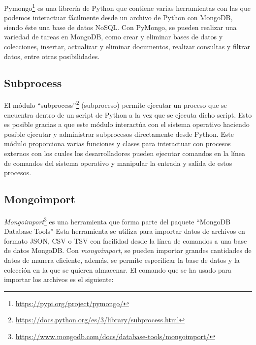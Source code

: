 \documentclass[a4paper, 12pt]{book}
\begin{document}
Pymongo\footnote{\url{https://pypi.org/project/pymongo/}} es una librería de Python que contiene varias herramientas con las que podemos interactuar fácilmente desde un archivo de Python con MongoDB, siendo éste una base de datos NoSQL. 
Con PyMongo, se pueden realizar una variedad de tareas en MongoDB, como crear y eliminar bases de datos y colecciones, insertar, actualizar y eliminar documentos, realizar consultas y filtrar datos, entre otras posibilidades.


\subsection{Subprocess} %
\label{sec:subprocess} %
El módulo ``subprocess''\footnote{\url{https://docs.python.org/es/3/library/subprocess.html}} (subproceso) permite ejecutar un proceso que se encuentra dentro de un script de Python a la vez que se ejecuta dicho script.
Esto es posible gracias a que este módulo interactúa con el sistema operativo haciendo posible ejecutar y administrar subprocesos directamente desde Python. 
Este módulo proporciona varias funciones y clases para interactuar con procesos externos con los cuales los desarrolladores pueden ejecutar comandos en la línea de comandos del sistema operativo y manipular la entrada y salida de estos procesos.

\subsection{Mongoimport} %
\label{sec:mongoimport} %

\emph{Mongoimport}\footnote{\url{https://www.mongodb.com/docs/database-tools/mongoimport/}} es una herramienta que forma parte del paquete ``MongoDB Database Tools''
Esta herramienta se utiliza para importar datos de archivos en formato JSON, CSV o TSV con facilidad desde la línea de comandos a una base de datos MongoDB. 
Con \emph{mongoimport}, se pueden importar grandes cantidades de datos de manera eficiente, además, se permite especificar la base de datos y la colección en la que se quieren almacenar.
El comando que se ha usado para importar los archivos es el siguiente:
\end{document}
